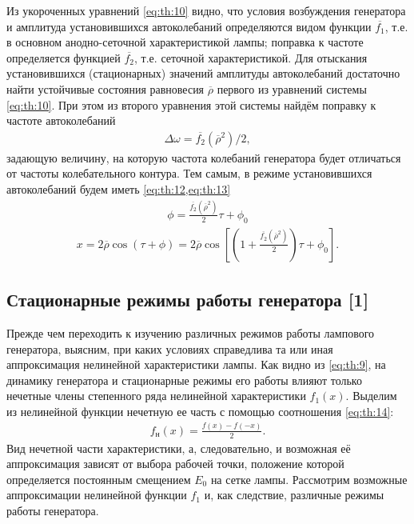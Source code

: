 Из укороченных уравнений \cref{eq:th:10} видно, что условия возбуждения генератора и амплитуда установившихся автоколебаний определяются видом функции $\overline{f_1}$, т.е. в основном анодно-сеточной характеристикой лампы; поправка к частоте определяется функцией $\overline{f_2}$, т.е. сеточной характеристикой. Для отыскания установившихся (стационарных) значений амплитуды автоколебаний достаточно найти устойчивые состояния равновесия $\overline{\rho}$ первого из уравнений системы \cref{eq:th:10}. При этом из второго уравнения этой системы найдём поправку к частоте автоколебаний
\begin{align} \label{eq:th:11}
	\Delta\omega = \overline{f_2}(\overline{\rho}^2)/2,
\end{align}
задающую величину, на которую частота колебаний генератора будет отличаться от частоты колебательного контура. Тем самым, в режиме установившихся автоколебаний будем иметь \cref{eq:th:12,eq:th:13}
\begin{align} \label{eq:th:12}
	\phi = \frac{\overline{f_2}(\overline{\rho}^2)}{2}\tau + \phi_0
\end{align}
\begin{align} \label{eq:th:13}
	x = 2\overline{\rho}\cos(\tau + \phi) = 2\overline{\rho}\cos\left[\left(1 + \frac{\overline{f_2}(\overline{\rho}^2)}{2}\right)\tau + \phi_0\right].
\end{align}

\subsection{Стационарные режимы работы генератора [1]}

Прежде чем переходить к изучению различных режимов работы лампового генератора, выясним, при каких условиях справедлива та или иная аппроксимация нелинейной характеристики лампы. Как видно из \cref{eq:th:9}, на динамику генератора и стационарные режимы его работы влияют только нечетные члены степенного ряда нелинейной характеристики $f_1(x)$. Выделим из нелинейной функции нечетную ее часть с помощью соотношения \cref{eq:th:14}:
\begin{align} \label{eq:th:14}
	f_\text{н}(x) = \frac{f(x) - f(-x)}{2}.
\end{align}
Вид нечетной части характеристики, а, следовательно, и возможная её аппроксимация зависят от выбора рабочей точки, положение которой определяется постоянным смещением $E_0$ на сетке лампы. Рассмотрим возможные аппроксимации нелинейной функции $f_1$ и, как следствие, различные режимы работы генератора.

